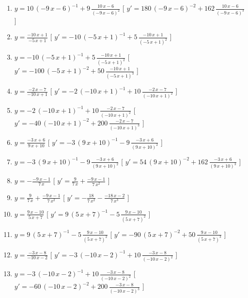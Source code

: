 \begin{esercizio}
\begin{enumerate}
\item $y= 10\, \left( -9\,x-6 \right) ^{-1}+9\,{\frac {10\,x-6}{ \left( -9\,x-6 \right) ^{2}}} $ \hfill [ $y'= 180\, \left( -9\,x-6 \right) ^{-2}+162\,{\frac {10\,x-6}{ \left( -9\,x-6 \right) ^{3}}}$ ]
\item $y= {\frac {-10\,x+1}{-5\,x+1}} $ \hfill [ $y'= -10\, \left( -5\,x+1 \right) ^{-1}+5\,{\frac {-10\,x+1}{ \left( -5\,x+1 \right) ^{2}}}$ ]
\item $y= -10\, \left( -5\,x+1 \right) ^{-1}+5\,{\frac {-10\,x+1}{ \left( -5\,x+1 \right) ^{2}}} $ \hfill [ $y'= -100\, \left( -5\,x+1 \right) ^{-2}+50\,{\frac {-10\,x+1}{ \left( -5\,x+1 \right) ^{3}}}$ ]
\item $y= {\frac {-2\,x-7}{-10\,x+1}} $ \hfill [ $y'= -2\, \left( -10\,x+1 \right) ^{-1}+10\,{\frac {-2\,x-7}{ \left( -10\,x+1 \right) ^{2}}}$ ]
\item $y= -2\, \left( -10\,x+1 \right) ^{-1}+10\,{\frac {-2\,x-7}{ \left( -10\,x+1 \right) ^{2}}} $ \hfill [ $y'= -40\, \left( -10\,x+1 \right) ^{-2}+200\,{\frac {-2\,x-7}{ \left( -10\,x+1 \right) ^{3}}}$ ]
\item $y= {\frac {-3\,x+6}{9\,x+10}} $ \hfill [ $y'= -3\, \left( 9\,x+10 \right) ^{-1}-9\,{\frac {-3\,x+6}{ \left( 9\,x+10 \right) ^{2}}}$ ]
\item $y= -3\, \left( 9\,x+10 \right) ^{-1}-9\,{\frac {-3\,x+6}{ \left( 9\,x+10 \right) ^{2}}} $ \hfill [ $y'= 54\, \left( 9\,x+10 \right) ^{-2}+162\,{\frac {-3\,x+6}{ \left( 9\,x+10 \right) ^{3}}}$ ]
\item $y= -{\frac {-9\,x-1}{7\,x}} $ \hfill [ $y'= {\frac {9}{7\,x}}+{\frac {-9\,x-1}{7\,{x}^{2}}}$ ]
\item $y= {\frac {9}{7\,x}}+{\frac {-9\,x-1}{7\,{x}^{2}}} $ \hfill [ $y'= -{\frac {18}{7\,{x}^{2}}}-{\frac {-18\,x-2}{7\,{x}^{3}}}$ ]
\item $y= {\frac {9\,x-10}{5\,x+7}} $ \hfill [ $y'= 9\, \left( 5\,x+7 \right) ^{-1}-5\,{\frac {9\,x-10}{ \left( 5\,x+7 \right) ^{2}}}$ ]
\item $y= 9\, \left( 5\,x+7 \right) ^{-1}-5\,{\frac {9\,x-10}{ \left( 5\,x+7 \right) ^{2}}} $ \hfill [ $y'= -90\, \left( 5\,x+7 \right) ^{-2}+50\,{\frac {9\,x-10}{ \left( 5\,x+7 \right) ^{3}}}$ ]
\item $y= {\frac {-3\,x-8}{-10\,x-2}} $ \hfill [ $y'= -3\, \left( -10\,x-2 \right) ^{-1}+10\,{\frac {-3\,x-8}{ \left( -10\,x-2 \right) ^{2}}}$ ]
\item $y= -3\, \left( -10\,x-2 \right) ^{-1}+10\,{\frac {-3\,x-8}{ \left( -10\,x-2 \right) ^{2}}} $ \hfill [ $y'= -60\, \left( -10\,x-2 \right) ^{-2}+200\,{\frac {-3\,x-8}{ \left( -10\,x-2 \right) ^{3}}}$ ]

\end{enumerate}
\end{esercizio}
